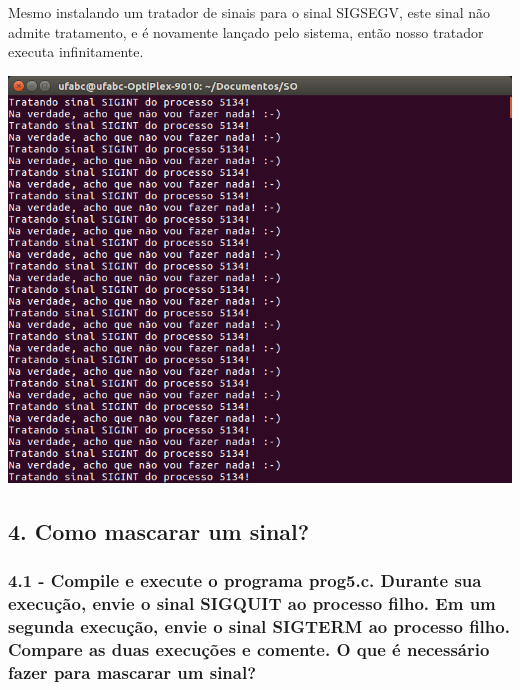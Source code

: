 \vspace{-0.5em}
\begin{minipage}{\textwidth}
  \hspace{-1em}
  \centering
  
  \label{prog4mod}
  \hspace{1em}
\end{minipage}
\vspace{0.5em}

Mesmo instalando um tratador de sinais para o sinal SIGSEGV, este sinal não admite tratamento, e é novamente lançado pelo sistema, então nosso tratador executa infinitamente.

\vspace{2em}
\begin{minipage}{\textwidth}
    \hspace{-1em}
    \centering
    \includegraphics[scale=.4]{pratica1/prog4mod.png}
    \label{prog4modpng}
    \hspace{1em}
\end{minipage}

\subsection*{4. Como mascarar um sinal?}

\subsubsection{4.1 -  Compile e execute o programa prog5.c. Durante sua execução, envie o sinal SIGQUIT ao processo ﬁlho. Em um segunda execução, envie o sinal SIGTERM ao processo ﬁlho. Compare as duas execuções e comente. O que é necessário fazer para mascarar um sinal? }

